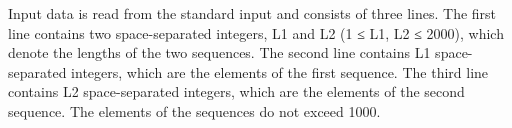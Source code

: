 Input data is read from the standard input and consists of three lines. The first line contains two space-separated integers, L1 and L2 (1 ≤ L1, L2 ≤ 2000), which denote the lengths of the two sequences. The second line contains L1 space-separated integers, which are the elements of the first sequence. The third line contains L2 space-separated integers, which are the elements of the second sequence. The elements of the sequences do not exceed 1000.